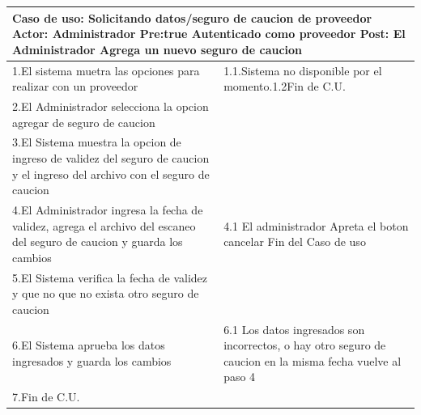 \begin{longtable}{|p{}|p{}|}
    \hline
    \multicolumn{2}{|p{16cm}|}{
        \textbf{Caso de uso:} Solicitando datos/seguro de caucion de proveedor\newline
        \textbf{Actor:} Administrador\newline
        \textbf{Pre:true }  Autenticado como proveedor\newline
        \textbf{Post:} El Administrador Agrega un nuevo seguro de caucion
    }\\
    \hline
    1.El sistema  muetra las opciones para realizar con un proveedor & 1.1.Sistema no  disponible por el momento.\newline 1.2Fin de C.U.\\
    \hline
    2.El Administrador selecciona la opcion agregar de seguro de caucion& \\
    \hline
    3.El Sistema muestra la opcion de ingreso de validez del seguro de caucion y el ingreso del archivo con el seguro de caucion&  \\
    \hline
    4.El Administrador ingresa la fecha de validez, agrega el archivo del escaneo del seguro de caucion y guarda los cambios&4.1 El administrador Apreta el boton cancelar \newline 4.2 Fin del Caso de uso \\
    \hline
    5.El Sistema verifica la fecha de validez y que no que no exista otro seguro de caucion & \\
    \hline
    6.El Sistema aprueba los datos ingresados y guarda los cambios &6.1 Los datos ingresados son incorrectos, o hay otro seguro de caucion en la misma fecha  \newline 6.2 vuelve al paso 4\\
    \hline
    7.Fin de C.U.& \\
    \hline
\end{longtable}



